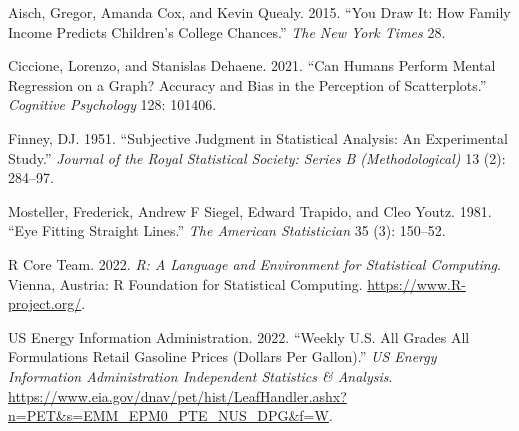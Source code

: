 \documentclass[
  letterpaper,
  DIV=11,
  numbers=noendperiod]{scrartcl}
\newlength{\cslhangindent}
\newlength{\cslentryspacingunit} %
\newenvironment{CSLReferences}[2] %
 {%
  \setlength{\parindent}{0pt}
  \ifodd #1
  \let\oldpar\par
  \def\par{\hangindent=\cslhangindent\oldpar}
  \fi
  \setlength{\parskip}{#2\cslentryspacingunit}
 }%
 {}
\begin{document}
\hypertarget{refs}{}
\begin{CSLReferences}{1}{0}
\leavevmode{}%
Aisch, Gregor, Amanda Cox, and Kevin Quealy. 2015. {``You Draw It: How
Family Income Predicts Children's College Chances.''} \emph{The New York
Times} 28.

\leavevmode{}%
Ciccione, Lorenzo, and Stanislas Dehaene. 2021. {``Can Humans Perform
Mental Regression on a Graph? Accuracy and Bias in the Perception of
Scatterplots.''} \emph{Cognitive Psychology} 128: 101406.

\leavevmode{}%
Finney, DJ. 1951. {``Subjective Judgment in Statistical Analysis: An
Experimental Study.''} \emph{Journal of the Royal Statistical Society:
Series B (Methodological)} 13 (2): 284--97.

\leavevmode{}%
Mosteller, Frederick, Andrew F Siegel, Edward Trapido, and Cleo Youtz.
1981. {``Eye Fitting Straight Lines.''} \emph{The American Statistician}
35 (3): 150--52.

\leavevmode{}%
R Core Team. 2022. \emph{R: A Language and Environment for Statistical
Computing}. Vienna, Austria: R Foundation for Statistical Computing.
\url{https://www.R-project.org/}.

\leavevmode{}%
US Energy Information Administration. 2022. {``Weekly {U}.{S}. {All}
{Grades} {All} {Formulations} {Retail} {Gasoline} {Prices} ({Dollars}
Per {Gallon}).''} \emph{US Energy Information Administration Independent
Statistics \& Analysis}.
\url{https://www.eia.gov/dnav/pet/hist/LeafHandler.ashx?n=PET\&s=EMM_EPM0_PTE_NUS_DPG\&f=W}.

\end{CSLReferences}
\end{document}
